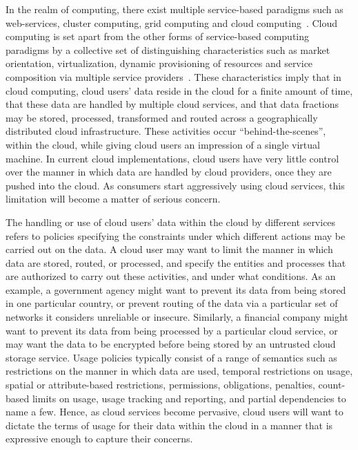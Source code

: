 \documentclass[10pt,letterpaper]{book}
\begin{document}
In the realm of computing, there exist multiple service-based paradigms such as web-services, cluster computing, grid computing and cloud computing~\cite{Bu:09}. Cloud computing is set apart from the other forms of service-based computing paradigms by a collective set of distinguishing characteristics such as market orientation, virtualization, dynamic provisioning of resources and service composition via multiple service providers~\cite{BuYeVeBrBr:09}. These characteristics imply that in cloud computing,  cloud users' data reside in the cloud for a finite amount of time, that these data are handled by multiple cloud services, and that data fractions may be stored, processed, transformed and routed across a geographically distributed cloud infrastructure. These activities occur ``behind-the-scenes'', within the cloud, while giving cloud users an impression of a single virtual machine.  In current cloud implementations,  cloud users have very little control over the manner in which data are handled by cloud providers, once they are pushed into the cloud. As consumers start aggressively using cloud services, this limitation will become a matter of serious concern. 

The handling or use of cloud users' data within the cloud by different services refers to policies specifying the constraints under which different actions may be carried out on the data. A cloud user may want to limit the manner in which data are stored, routed, or processed, and specify the entities and processes that are authorized to carry out these activities, and under what conditions. As an example, a government agency might want to prevent its data from being stored in one particular country, or prevent routing of the data via a particular set of networks it considers unreliable or insecure. Similarly, a financial company might want to prevent its data from being processed by a particular cloud service, or may want the data to be encrypted before being stored by an untrusted cloud storage service. Usage policies typically consist of a range of semantics such as restrictions on the manner in which data are used, temporal restrictions on usage, spatial or attribute-based restrictions, permissions, obligations, penalties, count-based limits on usage, usage tracking and reporting, and partial dependencies to name a few.   Hence, as cloud services become pervasive, cloud users will want to dictate the terms of usage for their data within the cloud in a manner that is expressive enough to capture their concerns. 
\end{document}
